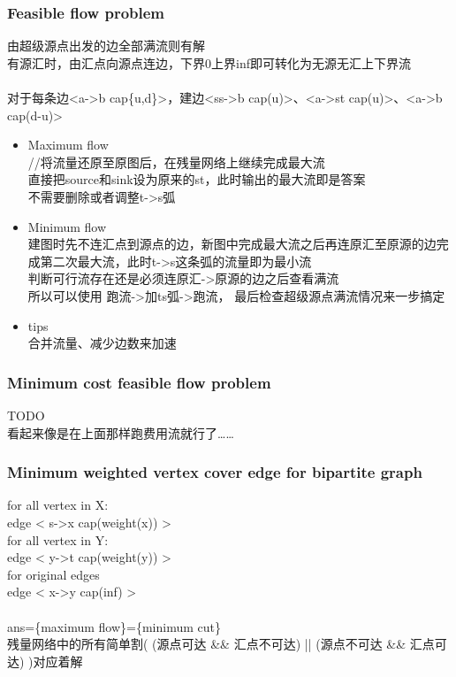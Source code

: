 \subsubsection{Feasible flow problem}
由超级源点出发的边全部满流则有解\\
有源汇时，由汇点向源点连边，下界0上界inf即可转化为无源无汇上下界流\\
\\
对于每条边<a->b cap\{u,d\}>，建边<ss->b cap(u)>、<a->st cap(u)>、<a->b cap(d-u)>
\begin{itemize}
\item Maximum flow\\
//将流量还原至原图后，在残量网络上继续完成最大流\\
直接把source和sink设为原来的st，此时输出的最大流即是答案\\
不需要删除或者调整t->s弧
\item Minimum flow\\
建图时先不连汇点到源点的边，新图中完成最大流之后再连原汇至原源的边完成第二次最大流，此时t->s这条弧的流量即为最小流\\
判断可行流存在还是必须连原汇->原源的边之后查看满流\\
所以可以使用 跑流->加ts弧->跑流， 最后检查超级源点满流情况来一步搞定
\item tips\\
合并流量、减少边数来加速
\end{itemize}
\subsubsection{Minimum cost feasible flow problem}
TODO\\
看起来像是在上面那样跑费用流就行了……
\subsubsection{Minimum weighted vertex cover edge for bipartite graph}
for all vertex in X:\\
edge < s->x cap(weight(x)) >\\
for all vertex in Y:\\
edge < y->t cap(weight(y)) >\\
for original edges\\
edge < x->y cap(inf) >\\
\\
ans=\{maximum flow\}=\{minimum cut\}\\
残量网络中的所有简单割( (源点可达 \&\& 汇点不可达) || (源点不可达 \&\& 汇点可达) )对应着解
